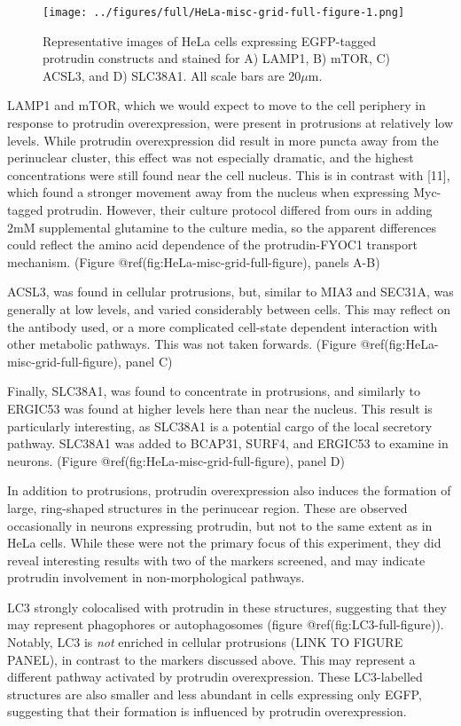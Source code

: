 \documentclass[
  12pt,
  a4paper,
]{article}
\begin{document}
\begin{figure}
\centering
\texttt{[image: ../figures/full/HeLa-misc-grid-full-figure-1.png]}
\caption{Representative images of HeLa cells expressing EGFP-tagged
protrudin constructs and stained for A) LAMP1, B) mTOR, C) ACSL3, and D)
SLC38A1. All scale bars are 20\(\mu\)m.}
\end{figure}

LAMP1 and mTOR, which we would expect to move to the cell periphery in
response to protrudin overexpression, were present in protrusions at
relatively low levels. While protrudin overexpression did result in more
puncta away from the perinuclear cluster, this effect was not especially
dramatic, and the highest concentrations were still found near the cell
nucleus. This is in contrast with {[}11{]}, which found a stronger
movement away from the nucleus when expressing Myc-tagged protrudin.
However, their culture protocol differed from ours in adding 2mM
supplemental glutamine to the culture media, so the apparent differences
could reflect the amino acid dependence of the protrudin-FYOC1 transport
mechanism. (Figure @ref(fig:HeLa-misc-grid-full-figure), panels A-B)

ACSL3, was found in cellular protrusions, but, similar to MIA3 and
SEC31A, was generally at low levels, and varied considerably between
cells. This may reflect on the antibody used, or a more complicated
cell-state dependent interaction with other metabolic pathways. This was
not taken forwards. (Figure @ref(fig:HeLa-misc-grid-full-figure), panel
C)

Finally, SLC38A1, was found to concentrate in protrusions, and similarly
to ERGIC53 was found at higher levels here than near the nucleus. This
result is particularly interesting, as SLC38A1 is a potential cargo of
the local secretory pathway. SLC38A1 was added to BCAP31, SURF4, and
ERGIC53 to examine in neurons. (Figure
@ref(fig:HeLa-misc-grid-full-figure), panel D)

In addition to protrusions, protrudin overexpression also induces the
formation of large, ring-shaped structures in the perinucear region.
These are observed occasionally in neurons expressing protrudin, but not
to the same extent as in HeLa cells. While these were not the primary
focus of this experiment, they did reveal interesting results with two
of the markers screened, and may indicate protrudin involvement in
non-morphological pathways.

LC3 strongly colocalised with protrudin in these structures, suggesting
that they may represent phagophores or autophagosomes (figure
@ref(fig:LC3-full-figure)). Notably, LC3 is \emph{not} enriched in
cellular protrusions (LINK TO FIGURE PANEL), in contrast to the markers
discussed above. This may represent a different pathway activated by
protrudin overexpression. These LC3-labelled structures are also smaller
and less abundant in cells expressing only EGFP, suggesting that their
formation is influenced by protrudin overexpression.
\end{document}
